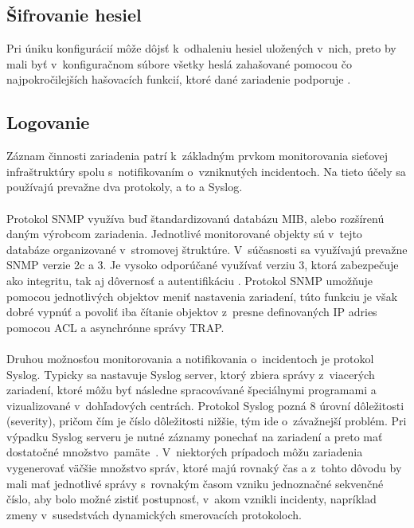 \subsection{Šifrovanie hesiel}
Pri úniku konfigurácií môže dôjsť k~odhaleniu hesiel uložených v~nich, preto by mali byť v~konfiguračnom súbore všetky heslá zahašované pomocou čo najpokročilejších hašovacích funkcií, ktoré dané zariadenie podporuje \cite{CIS_DrTLsgXv24lxeIIM}.

\subsection{Logovanie}
Záznam činnosti zariadenia patrí k~základným prvkom monitorovania sieťovej infraštruktúry spolu s~notifikovaním o~vzniknutých incidentoch. Na tieto účely sa používajú prevažne dva protokoly, a to  a Syslog. 
\\\\   
\noindent
Protokol SNMP využíva buď štandardizovanú databázu MIB, alebo rozšírenú daným výrobcom zariadenia. Jednotlivé monitorované objekty sú v~tejto databáze organizované v~stromovej štruktúre. V~súčasnosti sa využívajú prevažne SNMP verzie 2c a 3. Je vysoko odporúčané využívať verziu 3, ktorá zabezpečuje ako integritu, tak aj dôvernosť a autentifikáciu \cite{CIS_DrTLsgXv24lxeIIM}\cite{Graesser2001}. Protokol SNMP umožňuje pomocou jednotlivých objektov meniť nastavenia zariadení, túto funkciu je však dobré vypnúť a povoliť iba čítanie objektov z~presne definovaných IP adries pomocou ACL a asynchrónne správy TRAP.   
\\\\   
\noindent
Druhou možnosťou monitorovania a notifikovania o~incidentoch je protokol Syslog. Typicky sa nastavuje Syslog server, ktorý zbiera správy z~viacerých zariadení, ktoré môžu byť následne spracovávané špeciálnymi programami a vizualizované v~dohľadových centrách. Protokol Syslog pozná 8 úrovní dôležitosti (severity), pričom čím je číslo dôležitosti nižšie, tým ide o~závažnejší problém. Pri výpadku Syslog serveru je nutné záznamy ponechať na zariadení a preto mať dostatočné \mbox{množstvo pamäte \cite{Singh2018}\cite{uYLsMtQInofenpV3}}. V~niektorých prípadoch môžu zariadenia vygenerovať väčšie množstvo správ, ktoré majú rovnaký čas a z~tohto dôvodu by mali mať jednotlivé správy s~rovnakým časom vzniku jednoznačné sekvenčné číslo, aby bolo možné zistiť postupnosť, v~akom vznikli incidenty, napríklad zmeny v~susedstvách dynamických smerovacích protokoloch.

